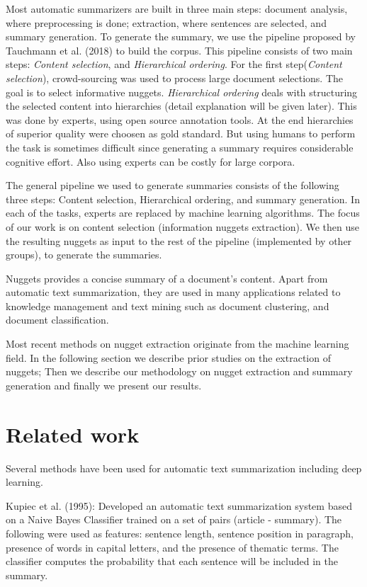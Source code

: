 \documentclass{article}
\begin{document}
Most automatic summarizers are built in three main steps: document analysis, where preprocessing is done; extraction, where sentences are selected, and summary generation. To generate the summary, we use the pipeline proposed by Tauchmann et al. (2018) \citep{Tauchmann.et.al.2018.LREC} to build the corpus. This pipeline consists of two main steps: \textit{Content selection}, and \textit{Hierarchical ordering}. For the first step(\textit{Content selection}), crowd-sourcing was used to process large document selections. The goal is to select informative nuggets. \textit{Hierarchical ordering} deals with structuring the selected content into hierarchies (detail explanation will be given later). This was done by experts, using open source annotation tools. At the end hierarchies of superior quality were choosen as gold standard. But using humans to perform the task is sometimes difficult since generating a summary requires considerable cognitive effort. Also using experts can be costly for large corpora.

The general pipeline we used to generate summaries consists of the following three steps: Content selection, Hierarchical ordering, and summary generation. In each of the tasks, experts are replaced by machine learning algorithms. The focus of our work is on content selection (information nuggets extraction). We then use the resulting nuggets as input to the rest of the pipeline (implemented by other groups), to generate the summaries.

Nuggets provides a concise summary of a document's content. Apart from automatic text summarization, they are used in many applications related to knowledge management and text mining such as document clustering, and document classification.

Most recent methods on nugget extraction originate from the machine learning field. In the following section we describe prior studies on the extraction of nuggets; Then we describe our methodology on nugget extraction and summary generation and finally we present our results.



\section{Related work}
Several methods have been used for automatic text summarization including deep learning.

Kupiec et al. (1995)\citep{kupiec.et.al.1995}: Developed an automatic text summarization system based on a Naive Bayes Classifier trained on a set of pairs (article - summary). The following were used as features: sentence length, sentence position in paragraph, presence of words in capital letters, and the presence of thematic terms. The classifier computes the probability that each sentence will be included in the summary.
\end{document}
